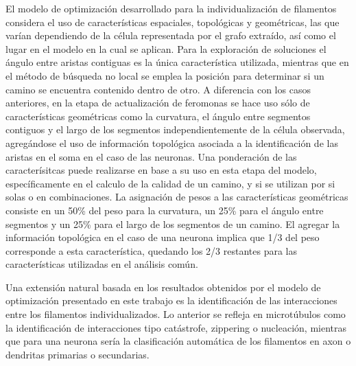 El modelo de optimizaci\'on desarrollado para la individualizaci\'on de filamentos considera el uso de caracter\'isticas espaciales, topol\'ogicas y geom\'etricas, las que var\'ian dependiendo de la c\'elula representada por el grafo extra\'ido, as\'i como el lugar en el modelo en la cual se aplican. Para la exploraci\'on de soluciones el \'angulo entre aristas contiguas es la \'unica caracter\'istica utilizada, mientras que en el m\'etodo de b\'usqueda no local se emplea la posici\'on para determinar si un camino se encuentra contenido dentro de otro. A diferencia con los casos anteriores, en la etapa de actualizaci\'on de feromonas
se hace uso s\'olo de caracter\'isticas geom\'etricas como  la curvatura, el \'angulo entre segmentos contiguos y el largo de los segmentos independientemente de la c\'elula observada, agreg\'andose el uso de informaci\'on topol\'ogica asociada a la identificaci\'on de las aristas en el soma en el caso de las neuronas. Una ponderaci\'on de las caracter\'isitcas puede realizarse en base a su uso en esta etapa del modelo, espec\'ificamente en el calculo de la calidad de un camino, y si se utilizan por si solas o en combinaciones. La asignaci\'on de pesos a las caracter\'isticas geom\'etricas consiste en un 50\% del peso para la curvatura, un 25\% para el \'angulo entre segmentos y un 25\% para el largo de los segmentos de un camino. El agregar la informaci\'on topol\'ogica en el caso de una neurona implica que 1/3 del peso corresponde a esta caracter\'istica, quedando los 2/3 restantes para las caracter\'isticas utilizadas en el an\'alisis com\'un. 








Una extensi\'on natural basada en los resultados obtenidos por el modelo de optimizaci\'on presentado en este trabajo es la identificaci\'on de las interacciones entre los filamentos individualizados. Lo anterior se refleja en microt\'ubulos como la identificaci\'on de interacciones tipo cat\'astrofe, zippering o nucleaci\'on, mientras que para una neurona ser\'ia la clasificaci\'on autom\'atica de los filamentos en axon o dendritas primarias o secundarias. 
